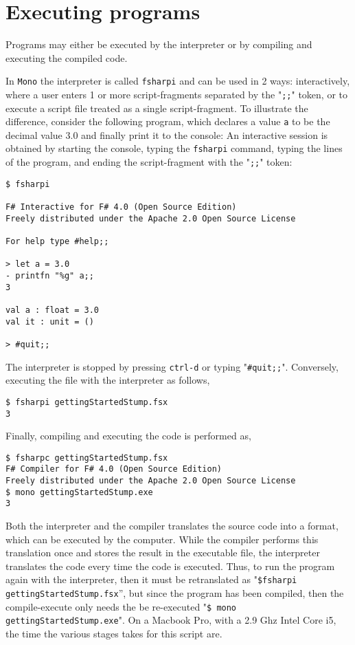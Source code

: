 \section{Executing programs}
Programs may either be executed by the interpreter or by compiling and executing the compiled code. 

In \texttt{Mono} the interpreter is called \texttt{fsharpi} and can be used in 2 ways: interactively, where a user enters 1 or more script-fragments separated by the "\verb|;;|" token, or to execute a script file treated as a single script-fragment. To illustrate the difference, consider the following program, which declares a value \texttt{a} to be the decimal value 3.0 and finally print it to the console:
An interactive session is obtained by starting the console, typing the \texttt{fsharpi} command, typing the lines of the program, and ending the script-fragment with the "\verb|;;|" token:
\begin{lstlisting}[language=console]
$ fsharpi

F# Interactive for F# 4.0 (Open Source Edition)
Freely distributed under the Apache 2.0 Open Source License

For help type #help;;

> let a = 3.0
- printfn "%g" a;;
3

val a : float = 3.0
val it : unit = ()

> #quit;;
\end{lstlisting}
The interpreter is stopped by pressing \texttt{ctrl-d} or typing "\verb|#quit;;|". Conversely, executing the file with the interpreter as follows,
\begin{lstlisting}
$ fsharpi gettingStartedStump.fsx
3
\end{lstlisting}
Finally, compiling and executing the code is performed as,
\begin{lstlisting}
$ fsharpc gettingStartedStump.fsx 
F# Compiler for F# 4.0 (Open Source Edition)
Freely distributed under the Apache 2.0 Open Source License
$ mono gettingStartedStump.exe 
3
\end{lstlisting}
Both the interpreter and the compiler translates the source code into a format, which can be executed by the computer. While the compiler performs this translation once and stores the result in the executable file, the interpreter translates the code every time the code is executed. Thus, to run the program again with the interpreter, then it must be retranslated as "\verb|$fsharpi gettingStartedStump.fsx|'', but since the program has been compiled, then the compile-execute only needs the be re-executed "\verb|$ mono gettingStartedStump.exe|". On a Macbook Pro, with a 2.9 Ghz Intel Core i5, the time the various stages takes for this script are.
